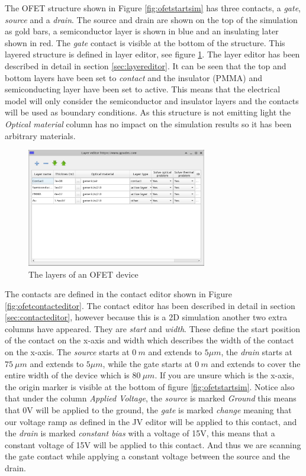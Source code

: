 The OFET structure shown in Figure \ref{fig:ofetstartsim} has three contacts, a \emph{gate}, \emph{source} and a \emph{drain}. The source and drain are shown on the top of the simulation as gold bars, a semiconductor layer is shown in blue and an insulating later shown in red.  The \emph{gate} contact is visible at the bottom of the structure.  This layered structure is defined in layer editor, see figure \ref{fig:ofetlayerstructure}. The layer editor has been described in detail in section \ref{sec:layereditor}. It can be seen that the top and bottom layers have been set to \emph{contact} and the insulator (PMMA) and semiconducting layer have been set to active. This means that the electrical model will only consider the semiconductor and insulator layers and the contacts will be used as boundary conditions.  As this structure is not emitting light the \emph{Optical material} column has no impact on the simulation results so it has been arbitrary materials.

\begin{figure}[H]
\centering
\includegraphics[width=0.7\textwidth]{./images/ofet/ofet_2.png}
\caption{The layers of an OFET device}
\label{fig:ofetlayerstructure}
\end{figure}

The contacts are defined in the contact editor shown in Figure \ref{fig:ofetcontacteditor}. The contact editor has been described in detail in 
section \ref{sec:contacteditor}, however because this is a 2D simulation another two extra columns have appeared. They are \emph{start} and \emph{width}.  These define the start position of the contact on the x-axis and width which describes the width of the contact on the x-axis.  The \emph{source} starts at $0~m$ and extends to $5 \mu m$, the  \emph{drain} starts at $75~\mu m$ and extends to $5 \mu m$, while the gate starts at $0~m$ and extends to cover the entire width of the device which is $80~ \mu m$.  If you are unsure which is the x-axis, the origin marker is visible at the bottom of figure \ref{fig:ofetstartsim}. Notice also that under the column \emph{Applied Voltage}, the \emph{source} is marked \emph{Ground} this means that 0V will be applied to the ground, the \emph{gate} is marked \emph{change} meaning that our voltage ramp as defined in the JV editor will be applied to this contact, and the \emph{drain} is marked \emph{constant bias} with a voltage of 15V, this means that a constant voltage of 15V will be applied to this contact. And thus we are scanning the gate contact while applying a constant voltage between the source and the drain.

